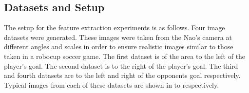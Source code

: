 \documentclass{article}
\begin{document}
\subsection{Datasets and Setup}
\label{sec:datasets}
The setup for the feature extraction experiments is as follows. Four image datasets were generated. These images were taken from the Nao's camera at different angles and scales in order to ensure realistic images similar to those taken in a robocup soccer game. The first dataset is of the area to the left of the player's goal. The second dataset is to the right of the player's goal. The third and fourth datasets are to the left and right of the opponents goal respectively. Typical images from each of these datasets are shown in  to  respectively.\\
\end{document}
